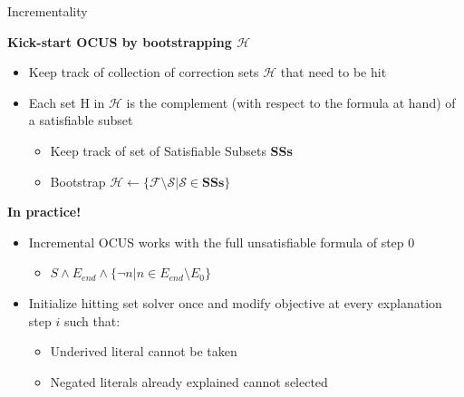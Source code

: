 \documentclass{beamer}
\newcommand\m[1]{\ensuremath{\mathcal{#1}}\xspace}
\newcommand\formula{\ensuremath{\m{F} }\xspace}
\renewcommand\emph[1]{{\color{vuborange}#1}}
\newcommand\subsetT{\m{\mathcal{S}}}
\newcommand\call[1]{\m{\textsc{#1}}}
\newcommand\setstohit{\m{\mathcal{H}}}
\newcommand\sat{\call{SAT}}
\newcommand\corrss{\call{Correction-Subsets}}
\newcommand\comus{\call{ocus}}
\newcommand\cohs{\call{CondOptHittingSet}}
\begin{document}
			
			
			\begin{frame}{Incrementality}
				
%						
\textbf{Kick-start OCUS by bootstrapping $\m{H}$}
				\begin{itemize}
					\item[$\triangleright$] Keep track of collection of correction sets $\m{H}$ that need to be hit \pause
					\item[$\triangleright$] Each set H in \m{H} is the complement (with respect to the formula at hand) of a \emph{satisfiable subset} \pause
					\begin{itemize}
						\item[$\rightarrow$] Keep track of \emph{set of Satisfiable Subsets \textbf{SSs}} \pause
						\item[$\rightarrow$] Bootstrap $\m{H} \gets \{\m{F} \setminus \m{S} | \m{S}  \in  \mathbf{SSs} \}$ 
					\end{itemize}					
				\end{itemize}
				\textbf{In practice!}
				\begin{itemize}
					\item Incremental OCUS works with the full unsatisfiable formula of step 0
					\begin{itemize}
						\item $S \wedge E_{end} \wedge \{ \lnot n | n \in E_{end} \setminus E_{0}\}$
					\end{itemize}
					\item Initialize hitting set solver once and modify objective at every explanation step $i$ such that:
					\begin{itemize}
						\item Underived literal cannot be taken 
						\item Negated literals already explained cannot selected
					\end{itemize} 
				\end{itemize}
			\end{frame}
			
\end{document}
